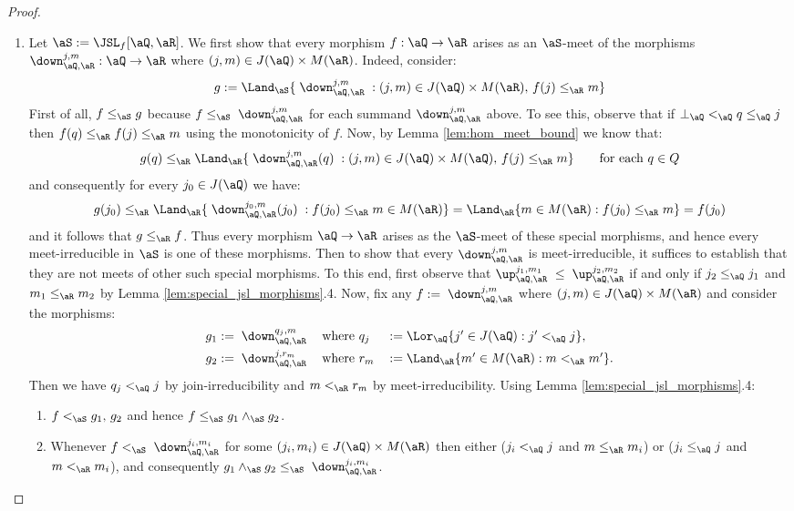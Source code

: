 \documentclass{article}
\begin{document}
\begin{proof}
\item
\begin{enumerate}
\item
Let $\aS := \JSL_f[\aQ,\aR]$. We first show that every morphism $f : \aQ \to \aR$ arises as an $\aS$-meet of the morphisms $\down_{\aQ,\aR}^{j,m} : \aQ \to \aR$ where $(j,m) \in J(\aQ) \times M(\aR)$. Indeed, consider:
\[
g := \Land_\aS \{ \; \down_{\aQ,\aR}^{j,m}  \; : (j,m) \in J(\aQ) \times M(\aR), \, f(j) \leq_\aR m \}
\]
First of all, $f \leq_\aS g$ because $f \leq_\aS \; \down_{\aQ,\aR}^{j,m}$ for each summand $\down_{\aQ,\aR}^{j,m}$ above. To see this, observe that if $\bot_\aQ <_\aQ q \leq_\aQ j$ then $f(q) \leq_\aR f(j) \leq_\aR m$ using the monotonicity of $f$. Now, by Lemma \ref{lem:hom_meet_bound} we know that:
\[
g(q) \leq_\aR \Land_\aR \{ \; \down_{\aQ,\aR}^{j,m}(q) \; : (j,m) \in J(\aQ) \times M(\aQ) , \, f(j) \leq_\aR m \} 
\qquad
\text{for each $q \in Q$}
\]
and consequently for every $j_0 \in J(\aQ)$ we have:
\[
g(j_0) 
\leq_\aR \Land_\aR \{ \; \down_{\aQ,\aR}^{j_0,m}(j_0) \; : f(j_0) \leq_\aR m \in M(\aR) \} 
= \Land_\aR \{ m \in M(\aR) : f(j_0) \leq_\aR m \} 
= f(j_0)
\]
and it follows that $g \leq_\aR f$. Thus every morphism $\aQ \to \aR$ arises as the $\aS$-meet of these special morphisms, and hence every meet-irreducible in $\aS$ is one of these morphisms. Then to show that every $\down_{\aQ,\aR}^{j,m}$ is meet-irreducible, it suffices to establish that they are not meets of other such special morphisms. To this end, first observe that $\up_{\aQ,\aR}^{j_1,m_1} \; \leq \; \up_{\aQ,\aR}^{j_2,m_2}$ if and only if $j_2 \leq_\aQ j_1$ and $m_1 \leq_\aR m_2$ by Lemma \ref{lem:special_jsl_morphisms}.4. Now, fix any $f  := \; \down_{\aQ,\aR}^{j,m}$ where $(j,m) \in J(\aQ) \times M(\aR)$ and consider the morphisms:
\[
\begin{tabular}{lll}
$g_1 := \; \down_{\aQ,\aR}^{q_j,m}$
&
where $q_j $ & $:= \Lor_\aQ \{ j' \in J(\aQ) : j' <_\aQ j \}$,
\\[1ex]
$g_2 := \; \down_{\aQ,\aR}^{j,r_m}$
&
where $r_m$ & $:= \Land_\aR \{ m' \in M(\aR) : m <_\aR m' \}$.
\end{tabular}
\]
Then we have $q_j <_\aQ j$ by join-irreducibility and $m <_\aR r_m$ by meet-irreducibility. Using Lemma \ref{lem:special_jsl_morphisms}.4:
\begin{enumerate}
\item
$f <_\aS g_1,\,g_2$ and hence $f \leq_\aS g_1 \land_\aS  g_2$.
\item
Whenever $f <_\aS \; \down_{\aQ,\aR}^{j_i,m_i}$ for some $(j_i,m_i) \in J(\aQ) \times M(\aR)$ then either ($j_i <_\aQ j$ and $m \leq_\aR m_i$) or ($j_i \leq_\aQ j$ and $m <_\aR m_i$), and consequently $g_1 \land_\aS g_2 \leq_\aS \; \down_{\aQ,\aR}^{j_i,m_i}$.
\end{enumerate}


\end{enumerate}
\end{proof}
\end{document}
